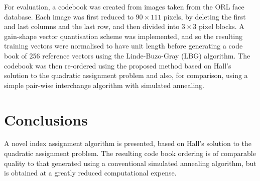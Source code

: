 \documentclass[12pt,a4paper]{report}
\begin{document}
For evaluation, a codebook was created from images taken from the ORL face
database.  Each image was first reduced to $90 \times 111$ pixels,
by deleting the first and last columns and the last row, and then divided into
$3 \times 3$ pixel blocks.  A gain-shape vector quantisation scheme was
implemented, and so the resulting training vectors were normalised to have unit
length before generating a code book of 256 reference vectors using the
Linde-Buzo-Gray (LBG) algorithm.  The codebook was then
re-ordered using the proposed method based on Hall's solution to the quadratic
assignment problem and also, for comparison, using a simple pair-wise
interchange algorithm with simulated annealing.
\chapter{Conclusions}

A novel index assignment algorithm is presented, based on Hall's solution to the
quadratic assignment problem.  The resulting code book ordering is of comparable
quality to that generated using a conventional simulated annealing algorithm,
but is obtained at a greatly reduced computational expense.
\end{document}
